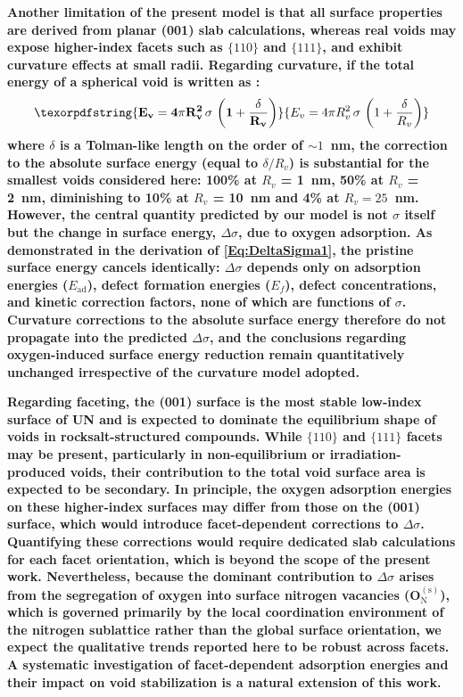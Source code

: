 \documentclass[preprint,12pt,sort&compress]{elsarticle}
\newcommand{\?}{\stackrel{?}{=}}
\providecommand{\DIFaddtex}[1]{{\bf #1}} %
\providecommand{\DIFaddbegin}{\protect\color{blue}} %
\providecommand{\DIFadd}[1]{\texorpdfstring{\DIFaddtex{#1}}{#1}} %
\newcommand{\DIFaddincludegraphics}[2][]{{\color{blue}\fbox{\DIFOincludegraphics[#1]{#2}}}} %
\DeclareRobustCommand{\DIFaddbegin}{\DIFOaddbegin \let\includegraphics\DIFaddincludegraphics} %
\begin{document}
\DIFaddbegin \DIFadd{Another limitation of the present model is that all surface properties are derived from planar (001) slab calculations, whereas real voids may expose higher-index facets such as $\{110\}$ and $\{111\}$, and exhibit curvature effects at small radii. Regarding curvature, if the total energy of a spherical void is written as \cite{Tolman1949,Chhapadia2011,Wang2021}:
}\begin{equation}
\DIFadd{E_v = 4 \pi R_v^2 \, \sigma \, \left(1 + \frac{\delta}{R_v} \right)    
}\end{equation}
\DIFadd{where $\delta$ is a Tolman-like length on the order of $\sim 1$~nm, the correction to the absolute surface energy (equal to $\delta/R_v$) is substantial for the smallest voids considered here: 100\% at $R_v$ = 1~nm, 50\% at $R_v$ = 2~nm, diminishing to 10\% at $R_v$ = 10~nm and 4\% at $R_v = 25$~nm. However, the central quantity predicted by our model is not $\sigma$ itself but the change in surface energy, $\Delta\sigma$, due to oxygen adsorption. As demonstrated in the derivation of \cref{Eq:DeltaSigma1}, the pristine surface energy cancels identically: $\Delta\sigma$ depends only on adsorption energies ($E_\mathrm{ad}$), defect formation energies ($E_f$), defect concentrations, and kinetic correction factors, none of which are functions of $\sigma$. Curvature corrections to the absolute surface energy therefore do not propagate into the predicted $\Delta\sigma$, and the conclusions regarding oxygen-induced surface energy reduction remain quantitatively unchanged irrespective of the curvature model adopted.
}

\DIFadd{Regarding faceting, the (001) surface is the most stable low-index surface of UN \cite{Zhukovskii2009SS} and is expected to dominate the equilibrium shape of voids in rocksalt-structured compounds. While $\{110\}$ and $\{111\}$ facets may be present, particularly in non-equilibrium or irradiation-produced voids, their contribution to the total void surface area is expected to be secondary. In principle, the oxygen adsorption energies on these higher-index surfaces may differ from those on the (001) surface, which would introduce facet-dependent corrections to $\Delta\sigma$. Quantifying these corrections would require dedicated slab calculations for each facet orientation, which is beyond the scope of the present work. Nevertheless, because the dominant contribution to $\Delta\sigma$ arises from the segregation of oxygen into surface nitrogen vacancies (O$_\mathrm{N}^{(\mathrm{s})}$), which is governed primarily by the local coordination environment of the nitrogen sublattice rather than the global surface orientation, we expect the qualitative trends reported here to be robust across facets. A systematic investigation of facet-dependent adsorption energies and their impact on void stabilization is a natural extension of this work.
}
\end{document}
